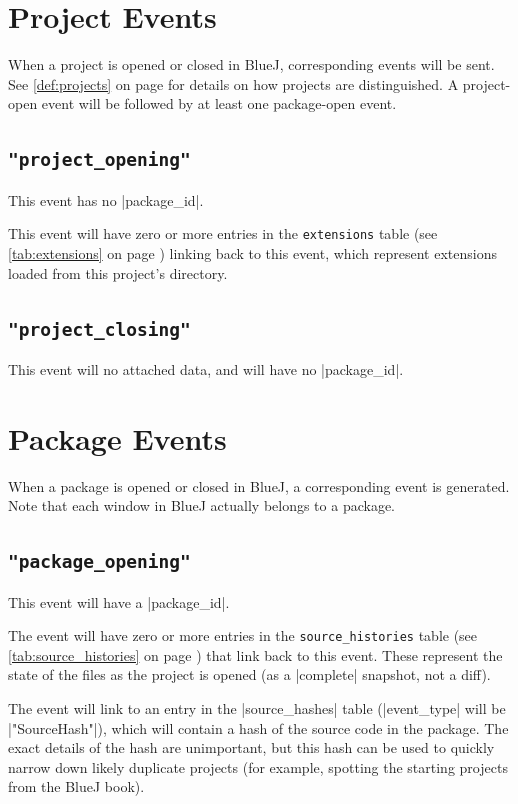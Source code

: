 \documentclass{report}
\newcommand{\myref}[1]{\autoref{#1} on page \pageref*{#1}}
\newcommand{\tabref}[1]{\lstinline|#1| table (see \myref{tab:#1})}
\begin{document}
\section{Project Events}

When a project is opened or closed in BlueJ, corresponding events will be
sent.  See \myref{def:projects} for details on how projects are
distinguished.  A project-open event will be followed by at least one
package-open event.

\subsection{\lstinline!"project_opening"!}

This event has no |package_id|.

This event will have zero or more entries in the \tabref{extensions} linking
back to this event, which represent extensions loaded from this project's directory.

\subsection{\lstinline!"project_closing"!}

This event will no attached data, and will have no |package_id|.

\section{Package Events}

When a package is opened or closed in BlueJ, a corresponding event is
generated.  Note that each window in BlueJ actually belongs to a package.

\subsection{\lstinline!"package_opening"!}

This event will have a |package_id|.

The event will have zero or more entries in the \tabref{source_histories} that
link back to this event.  These represent the state of the files as the project is
opened (as a |complete| snapshot, not a diff).

The event will link to an entry in the |source_hashes| table
(|event_type| will be |"SourceHash"|), which will contain a hash of
the source code in the package.  The exact details of the hash are
unimportant, but this hash can be used to quickly narrow down likely
duplicate projects (for example, spotting the starting projects from
the BlueJ book).
\end{document}
